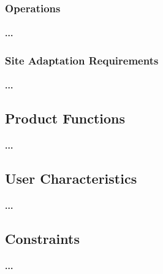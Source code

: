 \documentclass[runningheads,a4paper]{article}
\begin{document}
\subsubsection{Operations}
\paragraph{...}
\subsubsection{Site Adaptation Requirements}
\paragraph{...}

\subsection{Product Functions}
\paragraph{...}
\subsection{User Characteristics}
\paragraph{...}
\subsection{Constraints}
\paragraph{...}

 
\end{document}
